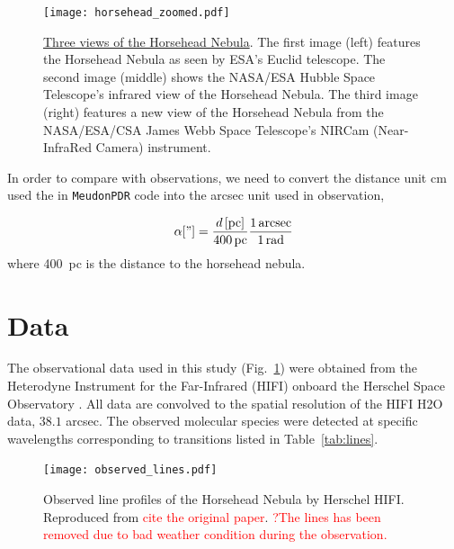 \documentclass[12pt,a4paper]{article}
\newcommand{\mdpdr}{\texttt{MeudonPDR} code}
\newcommand{\qt}[1]{\textcolor{red}{#1}}
\begin{document}
\begin{figure}
    \centering
    \texttt{[image: horsehead\_zoomed.pdf]}
    \caption{\href{https://www.esa.int/ESA_Multimedia/Images/2024/04/Webb_captures_iconic_Horsehead_Nebula_in_unprecedented_detail}{Three views of the Horsehead Nebula}. The first image (left) features the Horsehead Nebula as seen by ESA's Euclid telescope. The second image (middle) shows the NASA/ESA Hubble Space Telescope's infrared view of the Horsehead Nebula. The third image (right) features a new view of the Horsehead Nebula from the NASA/ESA/CSA James Webb Space Telescope's NIRCam (Near-InfraRed Camera) instrument.}
\end{figure}

In order to compare with observations, we need to convert the distance unit \unit{cm} used the in \mdpdr{} into the \unit{arcsec} unit used in observation,

\begin{equation}
    \alpha["] = \frac{d\,[\unit{pc}]}{400\,\unit{pc}} \frac{1\,\unit{arcsec}}{1\,\unit{rad}}\textbf{}
\end{equation}
where \qty{400}{pc} \parencite{Menten2007, Schlafly2014} is the distance to the horsehead nebula.

\section{Data}
The observational data used in this study (Fig.~\ref{fig:observation}) were obtained from the Heterodyne Instrument for the Far-Infrared (HIFI) \parencite{deGraauw2010} onboard the Herschel Space Observatory \parencite{Pilbratt2010}. All data are convolved to the spatial resolution of the HIFI H2O data, $38.1$ arcsec. The observed molecular species were detected at specific wavelengths corresponding to transitions listed in Table~\ref{tab:lines}. 

\begin{figure}
    \centering
    \texttt{[image: observed\_lines.pdf]}
    \caption{Observed line profiles of the Horsehead Nebula by Herschel HIFI. Reproduced from \qt{cite the original paper}. \qt{?The  lines has been removed due to bad weather condition during the observation.}} \label{fig:observation}
\end{figure}
\end{document}
